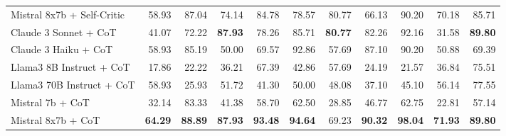 \begin{table}[H]
{\begin{tabular}{lrrrrrrrrrr}
\rowcolor{Gray}
Mistral 8x7b + Self-Critic & 58.93 & 87.04 & 74.14 & 84.78 & 78.57 & 80.77 & 66.13 & 90.20 & 70.18 & 85.71 \\
Claude 3 Sonnet + CoT & 41.07 & 72.22 & \textbf{87.93} & 78.26 & 85.71 & \textbf{80.77} & 82.26 & 92.16 & 31.58 & \textbf{89.80} \\
Claude 3 Haiku + CoT & 58.93 & 85.19 & 50.00 & 69.57 & 92.86 & 57.69 & 87.10 & 90.20 & 50.88 & 69.39 \\
Llama3 8B Instruct + CoT & 17.86 & 22.22 & 36.21 & 67.39 & 42.86 & 57.69 & 24.19 & 21.57 & 36.84 & 75.51 \\
Llama3 70B Instruct + CoT & 58.93 & 25.93 & 51.72 & 41.30 & 50.00 & 48.08 & 37.10 & 45.10 & 56.14 & 77.55 \\
Mistral 7b + CoT & 32.14 & 83.33 & 41.38 & 58.70 & 62.50 & 28.85 & 46.77 & 62.75 & 22.81 & 57.14 \\
Mistral 8x7b + CoT & \textbf{64.29} & \textbf{88.89} & \textbf{87.93} & \textbf{93.48} & \textbf{94.64} & 69.23 & \textbf{90.32} & \textbf{98.04} & \textbf{71.93} & \textbf{89.80} \\
\bottomrule
\end{tabular}
}


\end{table}
